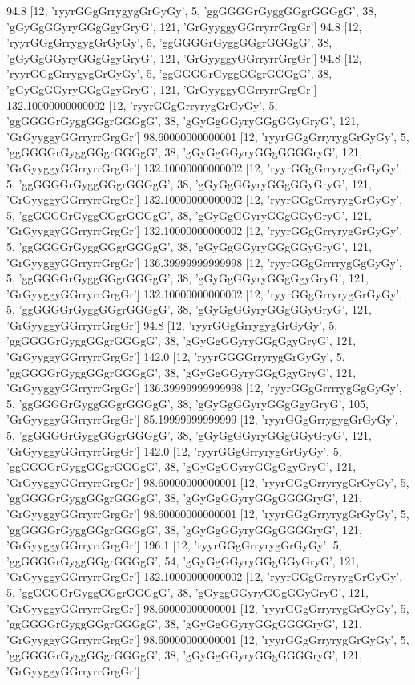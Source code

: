 94.8 [12, 'ryyrGGgGrrygygGrGyGy', 5, 'ggGGGGrGyggGGgrGGGgG', 38, 'gGyGgGGyryGGgGgyGryG', 121, 'GrGyyggyGGrryrrGrgGr']
94.8 [12, 'ryyrGGgGrrygygGrGyGy', 5, 'ggGGGGrGyggGGgrGGGgG', 38, 'gGyGgGGyryGGgGgyGryG', 121, 'GrGyyggyGGrryrrGrgGr']
94.8 [12, 'ryyrGGgGrrygygGrGyGy', 5, 'ggGGGGrGyggGGgrGGGgG', 38, 'gGyGgGGyryGGgGgyGryG', 121, 'GrGyyggyGGrryrrGrgGr']
132.10000000000002 [12, 'ryyrGGgGrryrygGrGyGy', 5, 'ggGGGGrGyggGGgrGGGgG', 38, 'gGyGgGGyryGGgGGyGryG', 121, 'GrGyyggyGGrryrrGrgGr']
98.60000000000001 [12, 'ryyrGGgGrryrygGrGyGy', 5, 'ggGGGGrGyggGGgrGGGgG', 38, 'gGyGgGGyryGGgGGGGryG', 121, 'GrGyyggyGGrryrrGrgGr']
132.10000000000002 [12, 'ryyrGGgGrryrygGrGyGy', 5, 'ggGGGGrGyggGGgrGGGgG', 38, 'gGyGgGGyryGGgGGyGryG', 121, 'GrGyyggyGGrryrrGrgGr']
132.10000000000002 [12, 'ryyrGGgGrryrygGrGyGy', 5, 'ggGGGGrGyggGGgrGGGgG', 38, 'gGyGgGGyryGGgGGyGryG', 121, 'GrGyyggyGGrryrrGrgGr']
132.10000000000002 [12, 'ryyrGGgGrryrygGrGyGy', 5, 'ggGGGGrGyggGGgrGGGgG', 38, 'gGyGgGGyryGGgGGyGryG', 121, 'GrGyyggyGGrryrrGrgGr']
136.39999999999998 [12, 'ryyrGGgGrrrrygGgGyGy', 5, 'ggGGGGrGyggGGgrGGGgG', 38, 'gGyGgGGyryGGgGgyGryG', 121, 'GrGyyggyGGrryrrGrgGr']
132.10000000000002 [12, 'ryyrGGgGrryrygGrGyGy', 5, 'ggGGGGrGyggGGgrGGGgG', 38, 'gGyGgGGyryGGgGGyGryG', 121, 'GrGyyggyGGrryrrGrgGr']
94.8 [12, 'ryyrGGgGrrygygGrGyGy', 5, 'ggGGGGrGyggGGgrGGGgG', 38, 'gGyGgGGyryGGgGgyGryG', 121, 'GrGyyggyGGrryrrGrgGr']
142.0 [12, 'ryyrGGGGrryrygGrGyGy', 5, 'ggGGGGrGyggGGgrGGGgG', 38, 'gGyGgGGyryGGgGgyGryG', 121, 'GrGyyggyGGrryrrGrgGr']
136.39999999999998 [12, 'ryyrGGgGrrrrygGgGyGy', 5, 'ggGGGGrGyggGGgrGGGgG', 38, 'gGyGgGGyryGGgGgyGryG', 105, 'GrGyyggyGGrryrrGrgGr']
85.19999999999999 [12, 'ryyrGGgGrrygygGrGyGy', 5, 'ggGGGGrGyggGGgrGGGgG', 38, 'gGyGgGGyryGGgGGyGryG', 121, 'GrGyyggyGGrryrrGrgGr']
142.0 [12, 'ryyrGGgGrryrygGrGyGy', 5, 'ggGGGGrGyggGGgrGGGgG', 38, 'gGyGgGGyryGGgGgyGryG', 121, 'GrGyyggyGGrryrrGrgGr']
98.60000000000001 [12, 'ryyrGGgGrryrygGrGyGy', 5, 'ggGGGGrGyggGGgrGGGgG', 38, 'gGyGgGGyryGGgGGGGryG', 121, 'GrGyyggyGGrryrrGrgGr']
98.60000000000001 [12, 'ryyrGGgGrryrygGrGyGy', 5, 'ggGGGGrGyggGGgrGGGgG', 38, 'gGyGgGGyryGGgGGGGryG', 121, 'GrGyyggyGGrryrrGrgGr']
196.1 [12, 'ryyrGGgGrryrygGrGyGy', 5, 'ggGGGGrGyggGGgrGGGgG', 54, 'gGyGgGGyryGGgGGyGryG', 121, 'GrGyyggyGGrryrrGrgGr']
132.10000000000002 [12, 'ryyrGGgGrryrygGrGyGy', 5, 'ggGGGGrGyggGGgrGGGgG', 38, 'gGyggGGyryGGgGGyGryG', 121, 'GrGyyggyGGrryrrGrgGr']
98.60000000000001 [12, 'ryyrGGgGrryrygGrGyGy', 5, 'ggGGGGrGyggGGgrGGGgG', 38, 'gGyGgGGyryGGgGGGGryG', 121, 'GrGyyggyGGrryrrGrgGr']
98.60000000000001 [12, 'ryyrGGgGrryrygGrGyGy', 5, 'ggGGGGrGyggGGgrGGGgG', 38, 'gGyGgGGyryGGgGGGGryG', 121, 'GrGyyggyGGrryrrGrgGr']
